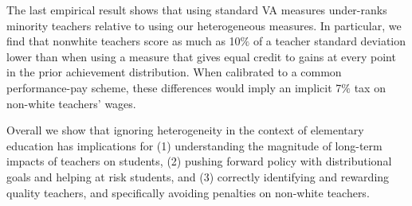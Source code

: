 \documentclass{article}
\theoremstyle{definition}
\theoremstyle{definition}
\theoremstyle{definition}
\begin{document}
The last empirical result shows that using standard VA measures under-ranks minority teachers relative to using our heterogeneous measures. In particular, we find that nonwhite teachers score as much as 10$\%$ of a teacher standard deviation lower than when using a measure that gives equal credit to gains at every point in the prior achievement distribution. When calibrated to a common performance-pay scheme, these differences would imply an implicit 7$\%$ tax on non-white teachers' wages.

Overall we show that ignoring heterogeneity in the context of elementary education has implications for (1) understanding the magnitude of long-term impacts of teachers on students, (2) pushing forward policy with distributional goals and helping at risk students, and (3) correctly identifying and rewarding quality teachers, and specifically avoiding penalties on non-white teachers.
\end{document}
